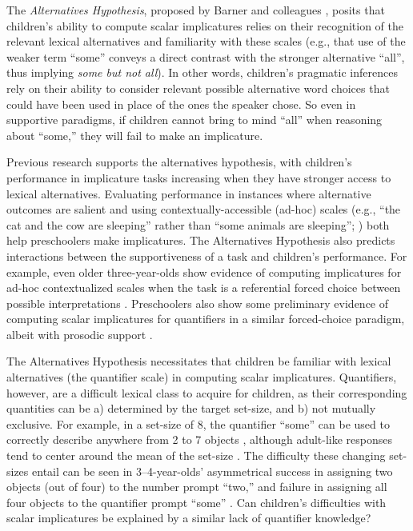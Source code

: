\documentclass[man]{apa2}
\begin{document}

The \emph{Alternatives Hypothesis}, proposed by Barner and colleagues \cite{barner2010, barner2011}, posits that children's ability to compute scalar implicatures relies on their recognition of the relevant lexical alternatives and familiarity with these scales (e.g., that use of the weaker term ``some'' conveys a direct contrast with the stronger alternative ``all'', thus implying \emph{some but not all}). In other words, children's pragmatic inferences rely on their ability to consider relevant possible alternative word choices that could have been used in place of the ones the speaker chose. So even in supportive paradigms, if children cannot bring to mind ``all'' when reasoning about ``some,'' they will fail to make an implicature.

Previous research supports the alternatives hypothesis, with children's performance in implicature tasks increasing when they have stronger access to lexical alternatives. Evaluating performance in instances where alternative outcomes are salient \cite{papafragou2003} and using contextually-accessible (ad-hoc) scales (e.g., ``the cat and the cow are sleeping'' rather than ``some animals are sleeping''; ) both help preschoolers make implicatures. The Alternatives Hypothesis also predicts interactions between the supportiveness of a task and children's performance. For example, even older three-year-olds show evidence of computing implicatures for ad-hoc contextualized scales when the task is a referential forced choice between possible interpretations \cite{stiller2014}. Preschoolers also show some preliminary evidence of computing scalar implicatures for quantifiers in a similar forced-choice paradigm, albeit with prosodic support \cite{miller2005}. 

The Alternatives Hypothesis necessitates that children be familiar with lexical alternatives (the quantifier scale) in computing scalar implicatures. Quantifiers, however, are a difficult lexical class to acquire for children, as their corresponding quantities can be a) determined by the target set-size, and b) not mutually exclusive. For example, in a set-size of 8, the quantifier ``some'' can be used to correctly describe anywhere from 2 to 7 objects \cite{barner2009}, although adult-like responses tend to center around the mean of the set-size \cite{franke2014}.  The difficulty these changing set-sizes entail can be seen in 3--4-year-olds' asymmetrical success in assigning two objects (out of four) to the number prompt ``two,'' and failure in assigning all four objects to the quantifier prompt ``some'' \cite{hurewitz2009}. Can children's difficulties with scalar implicatures be explained by a similar lack of quantifier knowledge? 
\end{document}
